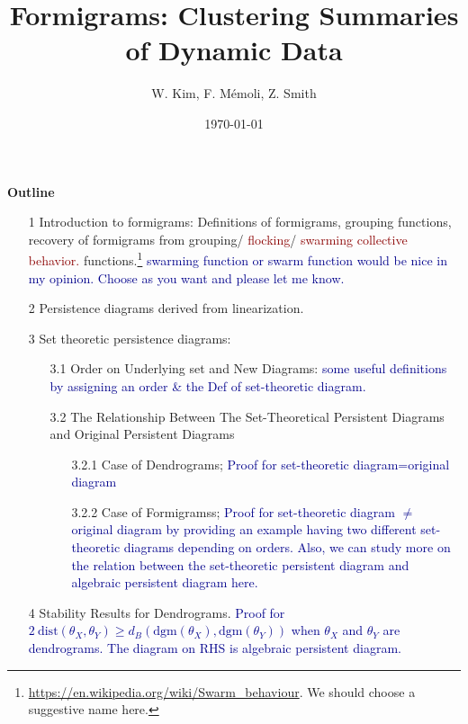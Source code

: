 \documentclass[a4paper,12pt]{article}
\title{Formigrams: Clustering Summaries of Dynamic Data}
\author{ W. Kim, F. M\'emoli, Z. Smith}
\date{\today}
\newcommand{\woojin}[1]           {{ \textcolor{darkblue} {#1}}}
\newcommand{\facundo}[1]                {{ \textcolor{darkred} {#1}}}
\newcommand{\dgm}{\mathrm{dgm}}
\begin{document}
\maketitle
\begin{center}
\textbf{Outline}
\end{center}

\begin{itemize}
\item[1] Introduction to formigrams: Definitions of formigrams, grouping functions, recovery of formigrams from grouping/\facundo{flocking}/
\facundo{swarming} \facundo{collective behavior.} functions.\footnote{\url{https://en.wikipedia.org/wiki/Swarm_behaviour}. We should choose a suggestive name here.} \woojin{swarming function or swarm function would be nice in my opinion. Choose as you want and please let me know.}

\item[2] Persistence diagrams derived from linearization. 

\item[3] Set theoretic persistence diagrams: %
\begin{itemize}
\item[3.1] Order on Underlying set and New Diagrams: \woojin{some useful definitions by assigning an order \& the Def of set-theoretic diagram.}
\item[3.2] The Relationship Between The Set-Theoretical Persistent Diagrams and Original Persistent Diagrams 
\begin{itemize}
\item[3.2.1] Case of Dendrograms; \woojin{Proof for set-theoretic diagram=original diagram}
\item[3.2.2] Case of Formigramss; \woojin{Proof for set-theoretic diagram $\neq$ original diagram by providing an example having two different set-theoretic diagrams depending on orders. Also, we can study more on the relation between the set-theoretic persistent diagram and algebraic persistent diagram here.}
\end{itemize}
\end{itemize}
\item[4] Stability Results for Dendrograms. \woojin{Proof for $2\ \mathrm{dist}(\theta_X, \theta_Y)\geq d_B(\dgm(\theta_X), \dgm(\theta_Y))$ when $\theta_X$ and $\theta_Y$ are dendrograms. The diagram on RHS is algebraic persistent diagram.}


\end{itemize}
\end{document}
